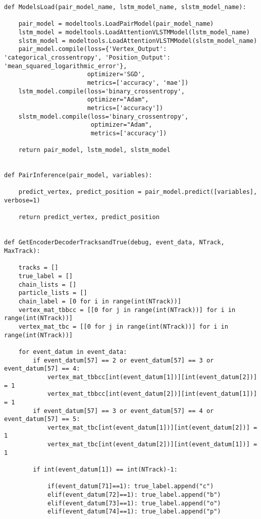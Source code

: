 \begin{lstlisting}[caption=崩壊点検出アルゴリズム用関数,label=VertexFinder1]
def ModelsLoad(pair_model_name, lstm_model_name, slstm_model_name):

    pair_model = modeltools.LoadPairModel(pair_model_name)
    lstm_model = modeltools.LoadAttentionVLSTMModel(lstm_model_name)
    slstm_model = modeltools.LoadAttentionVLSTMModel(slstm_model_name)
    pair_model.compile(loss={'Vertex_Output': 'categorical_crossentropy', 'Position_Output': 'mean_squared_logarithmic_error'},
                       optimizer='SGD',
                       metrics=['accuracy', 'mae'])
    lstm_model.compile(loss='binary_crossentropy',
                       optimizer="Adam",
                       metrics=['accuracy'])
    slstm_model.compile(loss='binary_crossentropy',
                        optimizer="Adam",
                        metrics=['accuracy'])

    return pair_model, lstm_model, slstm_model


def PairInference(pair_model, variables):

    predict_vertex, predict_position = pair_model.predict([variables], verbose=1)

    return predict_vertex, predict_position


def GetEncoderDecoderTracksandTrue(debug, event_data, NTrack, MaxTrack):

    tracks = []
    true_label = []
    chain_lists = []
    particle_lists = []
    chain_label = [0 for i in range(int(NTrack))]
    vertex_mat_tbbcc = [[0 for j in range(int(NTrack))] for i in range(int(NTrack))]
    vertex_mat_tbc = [[0 for j in range(int(NTrack))] for i in range(int(NTrack))]
    
    for event_datum in event_data:
        if event_datum[57] == 2 or event_datum[57] == 3 or event_datum[57] == 4:
            vertex_mat_tbbcc[int(event_datum[1])][int(event_datum[2])] = 1
            vertex_mat_tbbcc[int(event_datum[2])][int(event_datum[1])] = 1
        if event_datum[57] == 3 or event_datum[57] == 4 or event_datum[57] == 5:
            vertex_mat_tbc[int(event_datum[1])][int(event_datum[2])] = 1
            vertex_mat_tbc[int(event_datum[2])][int(event_datum[1])] = 1
        
        if int(event_datum[1]) == int(NTrack)-1:
            
            if(event_datum[71]==1): true_label.append("c")
            elif(event_datum[72]==1): true_label.append("b")
            elif(event_datum[73]==1): true_label.append("o")
            elif(event_datum[74]==1): true_label.append("p")
            

\end{lstlisting}
